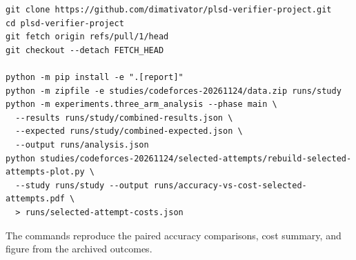\documentclass[11pt,a4paper]{article}
\begin{document}
{\small
\begin{verbatim}
git clone https://github.com/dimativator/plsd-verifier-project.git
cd plsd-verifier-project
git fetch origin refs/pull/1/head
git checkout --detach FETCH_HEAD

python -m pip install -e ".[report]"
python -m zipfile -e studies/codeforces-20261124/data.zip runs/study
python -m experiments.three_arm_analysis --phase main \
  --results runs/study/combined-results.json \
  --expected runs/study/combined-expected.json \
  --output runs/analysis.json
python studies/codeforces-20261124/selected-attempts/rebuild-selected-attempts-plot.py \
  --study runs/study --output runs/accuracy-vs-cost-selected-attempts.pdf \
  > runs/selected-attempt-costs.json
\end{verbatim}
}

The commands reproduce the paired accuracy comparisons, cost summary, and figure from the archived outcomes.
\end{document}
